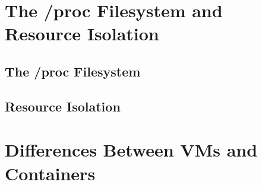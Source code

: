 \section{The /proc Filesystem and Resource Isolation}

    \subsection{The /proc Filesystem}
    \subsection{Resource Isolation}

\section{Differences Between VMs and Containers}

